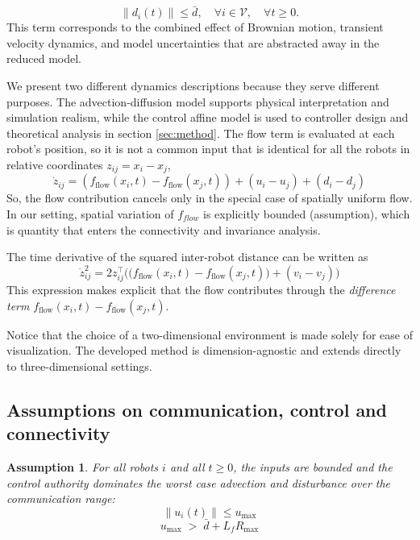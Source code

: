\documentclass[conference]{IEEEconf}
\theoremstyle{plain}
\newtheorem{assumption}{Assumption}
\begin{document}
$$\|d_i(t)\| \le \bar{d}, \quad \forall i \in \mathcal{V}, \quad \forall t \ge 0. $$
This term corresponds to the combined effect of Brownian motion, transient velocity dynamics, and model uncertainties that are abstracted away in the reduced model.

We present two different dynamics descriptions because they serve different purposes. The advection-diffusion model supports physical interpretation and simulation realism, while the control affine model is used to controller design and theoretical analysis in section \ref{sec:method}. The flow term is evaluated at each robot's position, so it is not a common input that is identical for all the robots in relative coordinates ${z_{ij}} = {x_i} - {x_j}$,
\begin{equation*}
    \dot{z}_{ij} = (f_{\text{flow}}(x_i, t) - f_{\text{flow}}(x_j, t)) + (u_i - u_j) + (d_i - d_j)
\end{equation*}
So, the flow contribution cancels only in the special case of spatially uniform flow. In our setting, spatial variation of $f_{flow}$ is explicitly bounded (assumption), which is quantity that enters the connectivity and invariance analysis.

The time derivative of the squared inter-robot distance can be written as
\begin{equation*}
    \dot{z}_{ij}^2 = 2{z}_{ij}^\top \Big( \big( f_{\text{flow}}(x_i,t) - f_{\text{flow}}(x_j,t) \big) + (v_i - v_j) \Big)
\end{equation*}
This expression makes explicit that the flow contributes through the \textit{difference term} $f_{\text{flow}}(x_i,t)-f_{\text{flow}}(x_j,t)$.


Notice that the choice of a two-dimensional environment is made solely for ease of visualization. The developed method is dimension-agnostic and extends directly to three-dimensional settings.

\subsection{Assumptions on communication, control and connectivity}
\label{subsec:assumptions}

\begin{assumption}
\label{ass:A1}
For all robots $i$ and all $t\ge 0$, the inputs are bounded and the control authority dominates the worst case advection  and disturbance over the communication range:
\begin{equation}
\|u_i(t)\| \le u_{\max}
\label{eq:A1}
\end{equation}
\begin{equation}
u_{\max} \;>\; \bar d + L_f R_{\max}
\label{eq:A2}
\end{equation}
\end{assumption}
\end{document}
